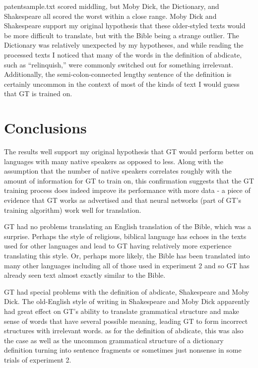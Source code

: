 \documentclass{article}
\begin{document}
patentsample.txt scored middling, but Moby Dick, the Dictionary, and Shakespeare all scored the worst within a close range. Moby Dick and Shakespeare support my original hypothesis that these older-styled texts would be more difficult to translate, but with the Bible being a strange outlier. The Dictionary was relatively unexpected by my hypotheses, and while reading the processed texts I noticed that many of the words in the definition of abdicate, such as ``relinquish,'' were commonly switched out for something irrelevant. Additionally, the semi-colon-connected lengthy sentence of the definition is certainly uncommon in the context of most of the kinds of text I would guess that GT is trained on.


\section{Conclusions}


The results well support my original hypothesis that GT would perform better on languages with many native speakers as opposed to less. Along with the assumption that the number of native speakers correlates roughly with the amount of information for GT to train on, this confirmation suggests that the GT training process does indeed improve its performance with more data - a piece of evidence that GT works as advertised and that neural networks (part of GT's training algorithm) work well for translation.





GT had no problems translating an English translation of the Bible, which was a surprise. Perhaps the style of religious, biblical language has echoes in the texts used for other languages and lead to GT having relatively more experience translating this style. Or, perhaps more likely, the Bible has been translated into many other languages including all of those used in experiment 2 and so GT has already seen text almost exactly similar to the Bible.





GT had special problems with the definition of abdicate, Shakespeare and Moby Dick. The old-English style of writing in Shakespeare and Moby Dick apparently had great effect on GT's ability to translate grammatical structure and make sense of words that have several possible meaning, leading GT to form incorrect structures with irrelevant words. as for the definition of abdicate, this was also the case as well as the uncommon grammatical structure of a dictionary definition turning into sentence fragments or sometimes just nonsense in some trials of experiment 2.
\end{document}
